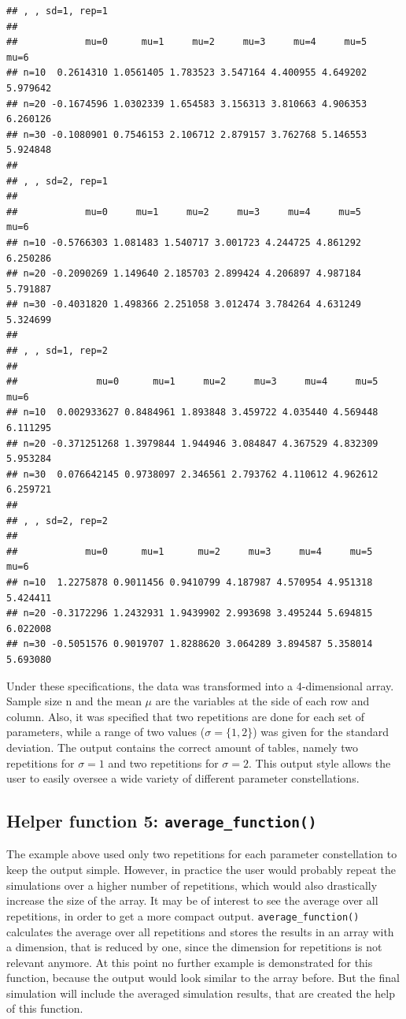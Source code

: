 \documentclass[11pt,a4paper]{article}
\begin{document}
\begin{verbatim}
## , , sd=1, rep=1
## 
##            mu=0      mu=1     mu=2     mu=3     mu=4     mu=5     mu=6
## n=10  0.2614310 1.0561405 1.783523 3.547164 4.400955 4.649202 5.979642
## n=20 -0.1674596 1.0302339 1.654583 3.156313 3.810663 4.906353 6.260126
## n=30 -0.1080901 0.7546153 2.106712 2.879157 3.762768 5.146553 5.924848
## 
## , , sd=2, rep=1
## 
##            mu=0     mu=1     mu=2     mu=3     mu=4     mu=5     mu=6
## n=10 -0.5766303 1.081483 1.540717 3.001723 4.244725 4.861292 6.250286
## n=20 -0.2090269 1.149640 2.185703 2.899424 4.206897 4.987184 5.791887
## n=30 -0.4031820 1.498366 2.251058 3.012474 3.784264 4.631249 5.324699
## 
## , , sd=1, rep=2
## 
##              mu=0      mu=1     mu=2     mu=3     mu=4     mu=5     mu=6
## n=10  0.002933627 0.8484961 1.893848 3.459722 4.035440 4.569448 6.111295
## n=20 -0.371251268 1.3979844 1.944946 3.084847 4.367529 4.832309 5.953284
## n=30  0.076642145 0.9738097 2.346561 2.793762 4.110612 4.962612 6.259721
## 
## , , sd=2, rep=2
## 
##            mu=0      mu=1      mu=2     mu=3     mu=4     mu=5     mu=6
## n=10  1.2275878 0.9011456 0.9410799 4.187987 4.570954 4.951318 5.424411
## n=20 -0.3172296 1.2432931 1.9439902 2.993698 3.495244 5.694815 6.022008
## n=30 -0.5051576 0.9019707 1.8288620 3.064289 3.894587 5.358014 5.693080
\end{verbatim}

Under these specifications, the data was transformed into a
4-dimensional array. Sample size n and the mean \(\mu\) are the
variables at the side of each row and column. Also, it was specified
that two repetitions are done for each set of parameters, while a range
of two values (\(\sigma = \{1, 2\}\)) was given for the standard
deviation. The output contains the correct amount of tables, namely two
repetitions for \(\sigma = 1\) and two repetitions for \(\sigma = 2\).
This output style allows the user to easily oversee a wide variety of
different parameter constellations.

\hypertarget{helper-function-5-average_function}{%
\subsection{\texorpdfstring{Helper function 5:
\texttt{average\_function()}}{Helper function 5: average\_function()}}\label{helper-function-5-average_function}}

The example above used only two repetitions for each parameter
constellation to keep the output simple. However, in practice the user
would probably repeat the simulations over a higher number of
repetitions, which would also drastically increase the size of the
array. It may be of interest to see the average over all repetitions, in
order to get a more compact output. \texttt{average\_function()}
calculates the average over all repetitions and stores the results in an
array with a dimension, that is reduced by one, since the dimension for
repetitions is not relevant anymore. At this point no further example is
demonstrated for this function, because the output would look similar to
the array before. But the final simulation will include the averaged
simulation results, that are created the help of this function.
\end{document}
